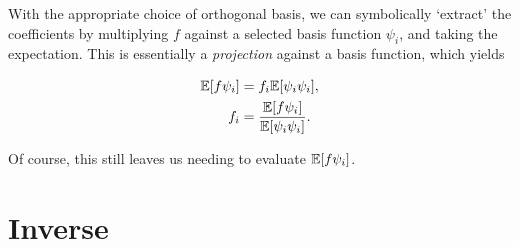 \documentclass[../primer.tex]{subfiles}
\begin{document}
With the appropriate choice of orthogonal basis, we can symbolically `extract'
the coefficients by multiplying $f$ against a selected basis function $\psi_i$,
and taking the expectation. This is essentially a \emph{projection} against a
basis function, which yields

\begin{equation} \begin{aligned}
  \mathbb{E}[f \psi_i] &= f_i \mathbb{E}[\psi_i \psi_i], \\
  f_i &= \frac{\mathbb{E}[f \psi_i]}{\mathbb{E}[\psi_i \psi_i]}.
\end{aligned} \end{equation}

\noindent Of course, this still leaves us needing to evaluate $\mathbb{E}[f \psi_i]$.

\section{Inverse}
\end{document}
